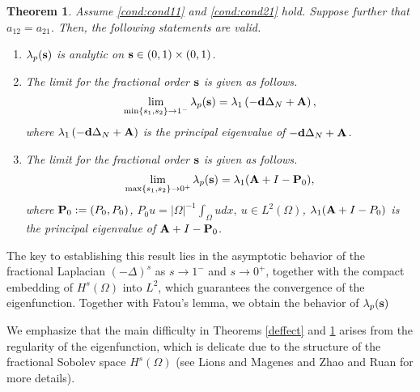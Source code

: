 \documentclass[a4paper,11pt]{amsart}
\newtheorem{theorem}{Theorem}
\theoremstyle{definition}
\def\O{\Omega}
\numberwithin{equation}{section}
\theoremstyle{definition}
\def\O{\Omega}
\begin{document}
\begin{theorem}\label{fracorder1}
Assume \ref{cond:cond11} and \ref{cond:cond21} hold. Suppose further that $a_{12}=a_{21}$. Then, the following statements are valid.

\begin{enumerate}[label=(\roman*)]
\item \label{analytic} $\lambda_p({\bf s})$  is analytic on ${\bf s}\in (0,1)\times (0,1)$.

\item \label{limit1s1} The limit for the fractional order ${\bf s}$ is given as follows.
\begin{align*}
\lim\limits_{\min\{s_1,s_2\}\rightarrow 1^-}\lambda_p({\bf s})=\lambda_1\left(-{\bf d}\Delta_N+ {\bf A}\right),
\end{align*}
where $\lambda_1\left(-\textbf{d}\Delta_N+ {\bf A}\right)$ is the principal eigenvalue of $-\textbf{d}\Delta_N+ {\bf A}$.


\item \label{limit1s0} The limit for the fractional order ${\bf s}$ is given as follows.
\begin{align*}
\lim\limits_{\max\{s_1,s_2\}\rightarrow 0^+}\lambda_p({\bf s})=\lambda_1({\bf A}+ I-{\bf P}_0),
\end{align*}
where ${\bf P}_0:=(P_0,P_0)$, $P_0u=|\O|^{-1}\displaystyle\int_{\O}udx,~u\in L^2(\O)$, $\lambda_1({\bf A}+ I-P_0)$ is the principal eigenvalue of ${\bf A}+ I-{\bf P}_0$.


%
\end{enumerate}
\end{theorem}


The key to establishing this result lies in the asymptotic behavior of the fractional Laplacian 
$(-\Delta)^s$ as $s \to 1^-$ and $s \to 0^+$, together with the compact embedding of 
$H^s(\Omega)$ into $L^2$, which guarantees the convergence of the eigenfunction. Together with Fatou's lemma, we obtain the behavior of $\lambda_p({\bf s})$

We emphasize that the main difficulty in Theorems \ref{deffect} and \ref{fracorder1} 
arises from the regularity of the eigenfunction, which is delicate due to the structure of the fractional Sobolev space $H^s(\Omega)$ (see Lions and Magenes \cite[Chapter~1]{lions_pro_1968} 
and Zhao and Ruan \cite[Section~2]{zhao_spatiotemporal_2025} for more details).
\end{document}
